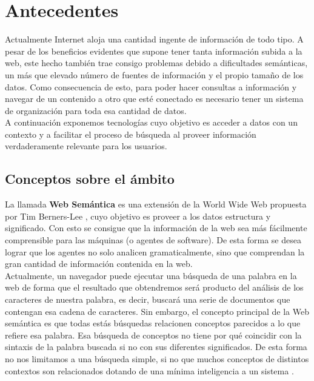 \chapter{Antecedentes}
\label{cap:estadoDeLaCuestion}

Actualmente Internet aloja una cantidad ingente de información de todo tipo. A pesar de los beneficios evidentes que supone tener tanta información subida a la web, este hecho también trae consigo problemas debido a dificultades semánticas, un más que elevado número de fuentes de información y el propio tamaño de los datos. Como consecuencia de esto, para poder hacer consultas a información y navegar de un contenido a otro que esté conectado es necesario tener un sistema de organización para toda esa cantidad de datos.\\

A continuación exponemos tecnologías cuyo objetivo es acceder a datos con un contexto y a facilitar el proceso de búsqueda al proveer información verdaderamente relevante para los usuarios.\\

\section{Conceptos sobre el ámbito}

La llamada \textbf{Web Semántica} es una extensión de la World Wide Web propuesta por Tim Berners-Lee \cite{berners2001}, cuyo objetivo es proveer a los datos estructura y significado. Con esto se consigue que la información de la web sea más fácilmente comprensible para las máquinas (o agentes de software). De esta forma se desea lograr que los agentes no solo analicen gramaticalmente, sino que comprendan la gran cantidad de información contenida en la web.\\

Actualmente, un navegador puede ejecutar una búsqueda de una palabra en la web de forma que el resultado que obtendremos será producto del análisis de los caracteres de nuestra palabra, es decir, buscará una serie de documentos que contengan esa cadena de caracteres. Sin embargo, el concepto principal de la Web semántica es que todas estás búsquedas relacionen conceptos parecidos a lo que refiere esa palabra. Esa búsqueda de conceptos no tiene por qué coincidir con la sintaxis de la palabra buscada si no con sus diferentes significados. De esta forma no nos limitamos a una búsqueda simple, si no que muchos conceptos de distintos contextos son relacionados dotando de una mínima inteligencia a un sistema \cite{codina2006}.\\

